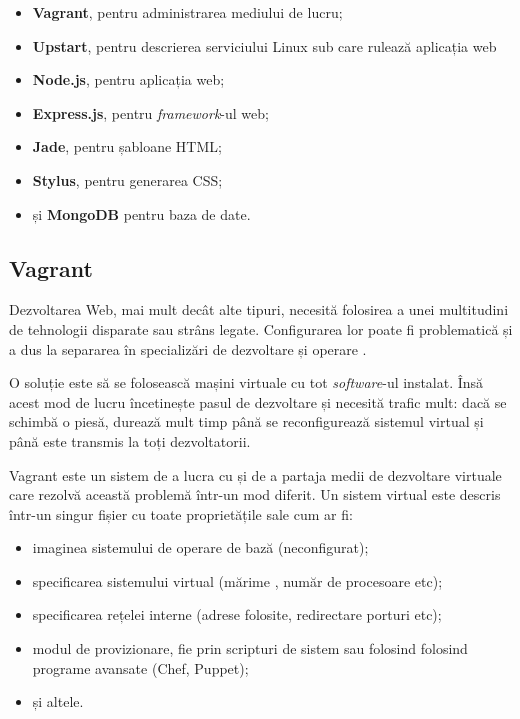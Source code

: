 \documentclass[a4wide,12pt]{report}
\newcommand{\eng}[1]{\emph{#1}} %
\newcommand{\acr}[1]{{\textsmaller[1]{\textsc{#1}}}} %
\begin{document}
\begin{itemize}

\item \textbf{Vagrant}, pentru administrarea mediului de lucru;

\item \textbf{Upstart}, pentru descrierea serviciului Linux sub care rulează
aplicația web

\item \textbf{Node.js}, pentru aplicația web;

\item \textbf{Express.js}, pentru \eng{framework}-ul web;

\item \textbf{Jade}, pentru șabloane HTML;

\item \textbf{Stylus}, pentru generarea CSS;

\item și \textbf{MongoDB} pentru baza de date.

\end{itemize}

\subsection{Vagrant}

Dezvoltarea Web, mai mult decât alte tipuri, necesită folosirea a unei
multitudini de tehnologii disparate sau strâns legate. Configurarea lor poate fi
problematică și a dus la separarea în specializări de dezvoltare și operare
\acr{IT}.

O soluție este să se folosească mașini virtuale cu tot \eng{software}-ul
instalat. Însă acest mod de lucru încetinește pasul de dezvoltare și necesită
trafic mult: dacă se schimbă o piesă, durează mult timp până se reconfigurează
sistemul virtual și până este transmis la toți dezvoltatorii.

Vagrant este un sistem de a lucra cu și de a partaja medii de dezvoltare
virtuale care rezolvă această problemă într-un mod diferit. Un sistem virtual
este descris într-un singur fișier cu toate proprietățile sale cum ar fi:

\begin{itemize}

\item imaginea sistemului de operare de bază (neconfigurat);

\item specificarea sistemului virtual (mărime \acr{RAM}, număr de procesoare
etc);

\item specificarea rețelei interne (adrese \acr{IP} folosite, redirectare
porturi etc);

\item modul de provizionare, fie prin scripturi de sistem sau folosind folosind
programe avansate (Chef, Puppet);

\item și altele.

\end{itemize}
\end{document}
